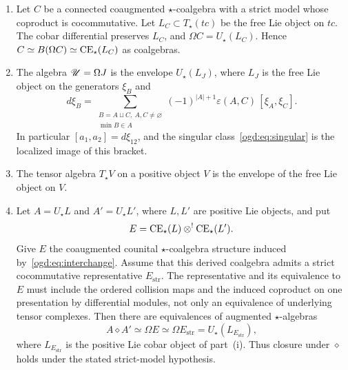 \begin{proposition}\label{ogd:prop:envelope-sector}
\begin{enumerate}
\item Let \(C\) be a connected coaugmented \(\star\)-coalgebra with a strict model whose coproduct is cocommutative.
Let \(L_C\subset T_\star(tc)\) be the free Lie object on \(tc\).
The cobar differential preserves \(L_C\), and \(\Omega C=U_\star(L_C)\).
Hence \(C\simeq B(\Omega C)\simeq\operatorname{CE}_\star(L_C)\) as coalgebras.
\item The\label{ogd:def:dualizing-lie-cobar} algebra \(\mathscr U=\Omega J\) is the envelope \(U_\star(L_J)\), where \(L_J\) is the free Lie object on the generators \(\xi_B\) and
\begin{equation}\label{ogd:eq:J-Lie}
 d\xi_B=\sum_{\substack{B=A\sqcup C,\ A,C\ne\varnothing\\ \min B\in A}}
 (-1)^{|A|+1}\varepsilon(A,C)\,[\xi_A,\xi_C].
\end{equation}
In particular \([a_1,a_2]=d\xi_{12}\), and the singular class~\eqref{ogd:eq:singular} is the localized image of this bracket.
\item The tensor algebra \(T_\star V\) on a positive object \(V\) is the envelope of the free Lie object on \(V\).
\item Let \(A=U_\star L\) and \(A'=U_\star L'\), where \(L,L'\) are positive Lie objects, and put
\[
 E=\operatorname{CE}_\star(L)\mathbin{\otimes^!}\operatorname{CE}_\star(L').
\]
Give \(E\) the coaugmented counital \(\star\)-coalgebra structure induced by~\eqref{ogd:eq:interchange}.
Assume that this derived coalgebra admits a strict cocommutative representative \(E_{\mathrm{str}}\).
The representative and its equivalence to \(E\) must include the ordered collision maps and the induced coproduct on one presentation by differential modules, not only an equivalence of underlying tensor complexes.
Then there are equivalences of augmented \(\star\)-algebras
\[
 A\diamond A'\simeq\Omega E\simeq\Omega E_{\mathrm{str}}
       =U_\star(L_{E_{\mathrm{str}}}),
\]
where \(L_{E_{\mathrm{str}}}\) is the positive Lie cobar object of part~\textup{(i)}.
Thus closure under \(\diamond\) holds under the stated strict-model hypothesis.
\end{enumerate}
\end{proposition}

